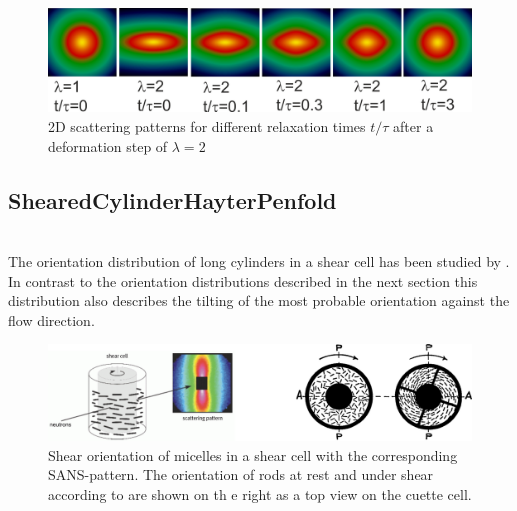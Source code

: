 \begin{figure}[htb]
\begin{center}
\includegraphics[width=\textwidth]{../images/form_factor/reptating_chain/lambda_2_reptating_chains.png}
\end{center}
\caption{2D scattering patterns for different relaxation times $t/\tau$ after a deformation step of $\lambda=2$}
\label{fig:IQ2Dstretchedpolymermelt}
\end{figure}

\newpage
\subsection{ShearedCylinderHayterPenfold}
\label{sect:ShearedCylinderHayterPenfold}
\hspace{1pt}\\
The orientation distribution of long cylinders in a shear cell has been studied by \cite{Scheraga1951,Jerrard1959,Hayter1984}. In contrast to the orientation distributions described in the next section this distribution also describes the tilting of the most probable orientation against the flow direction.
\begin{figure}[htb]
\begin{center}
\includegraphics[width=\textwidth]{sheared_cylinders_n_phi0.png}
\end{center}
\caption{Shear orientation of micelles in a shear cell with the
corresponding SANS-pattern. The orientation of rods at rest and under shear according to \cite{Scheraga1951} are shown on th e right as a top view on the cuette cell.} \label{sheared_cylinders1}
\end{figure}

